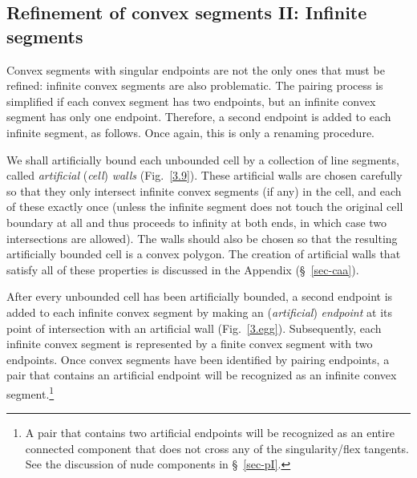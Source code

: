 
\subsection{Refinement of convex segments II: Infinite segments}
\label{sec-refine2}

Convex segments with singular endpoints are not the only ones that must
be refined: infinite convex segments are also problematic.
The pairing process is simplified if each convex segment has two endpoints,
but an infinite convex segment has only one endpoint.
Therefore, a second endpoint is added to each infinite segment, as follows.
Once again, this is only a renaming procedure.


We shall artificially bound each unbounded cell by a collection of line segments,
called {\em artificial} ({\em cell}) {\em walls} (Fig.~\ref{3.9}).
These artificial walls are chosen carefully so that they only intersect 
infinite convex segments (if any) in the cell, and each of these exactly once 
(unless the infinite segment does not touch the original cell boundary at all
and thus proceeds
to infinity at both ends, in which case two intersections are allowed).
The walls should also be chosen so that the resulting artificially bounded cell 
is a convex polygon.
The creation of artificial walls that satisfy all of these properties
is discussed in the Appendix (\S~\ref{sec-caa}).

After every unbounded cell has been artificially bounded, a second endpoint
is added to each infinite convex segment by making an ({\em artificial}) {\em endpoint} 
at its point of intersection with an artificial wall (Fig.~\ref{3.egg}).
Subsequently, each infinite convex segment is represented by a finite convex
segment with two endpoints.
Once convex segments have been identified by pairing endpoints, 
a pair that contains an artificial endpoint will be recognized as an infinite convex 
segment.\footnote{A pair that contains two artificial endpoints will be recognized as 
	an entire connected component that does not cross any of the singularity/flex 
	tangents. See the discussion of nude components in \S~\ref{sec-pI}.}

